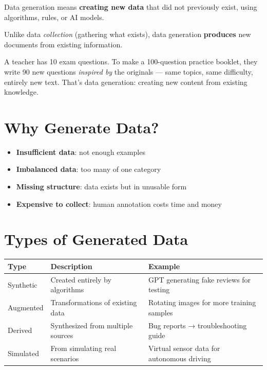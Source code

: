 \documentclass[11pt,a4paper]{report}
\begin{document}
Data generation means \textbf{creating new data} that did not previously exist, using algorithms, rules, or AI models.

Unlike data \textit{collection} (gathering what exists), data generation \textbf{produces} new documents from existing information.

\begin{analogybox}
A teacher has 10 exam questions. To make a 100-question practice booklet, they write 90 new questions \textit{inspired by} the originals --- same topics, same difficulty, entirely new text. That's data generation: creating new content from existing knowledge.
\end{analogybox}

\section{Why Generate Data?}

\begin{itemize}
    \item \textbf{Insufficient data}: not enough examples
    \item \textbf{Imbalanced data}: too many of one category
    \item \textbf{Missing structure}: data exists but in unusable form
    \item \textbf{Expensive to collect}: human annotation costs time and money
\end{itemize}

\section{Types of Generated Data}

\begin{table}[h]
\centering
\begin{tabularx}{\textwidth}{l X X}
\toprule
\textbf{Type} & \textbf{Description} & \textbf{Example} \\
\midrule
Synthetic & Created entirely by algorithms & GPT generating fake reviews for testing \\
Augmented & Transformations of existing data & Rotating images for more training samples \\
Derived & Synthesized from multiple sources & Bug reports → troubleshooting guide \\
Simulated & From simulating real scenarios & Virtual sensor data for autonomous driving \\
\bottomrule
\end{tabularx}
\end{table}
\end{document}

